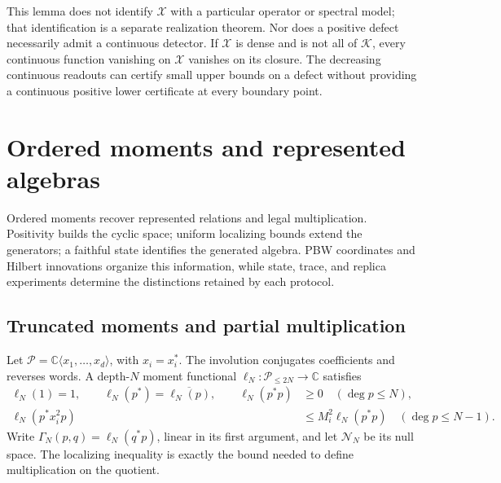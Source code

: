 \documentclass[11pt,a4paper]{amsart}
\numberwithin{equation}{section}
\theoremstyle{definition}
\theoremstyle{remark}
\newcommand{\C}{\mathbb C}
\newcommand{\PP}{\mathcal P}
\begin{document}
This lemma does not identify $\mathcal X$ with a particular operator or spectral model; that identification is a separate realization theorem. Nor does a positive defect necessarily admit a continuous detector. If $\mathcal X$ is dense and is not all of $\mathcal K$, every continuous function vanishing on $\mathcal X$ vanishes on its closure. The decreasing continuous readouts can certify small upper bounds on a defect without providing a continuous positive lower certificate at every boundary point.


\section{Ordered moments and represented algebras}\label{sec:ordered}\label{sec:minimality}
Ordered moments recover represented relations and legal multiplication. Positivity builds the cyclic space; uniform localizing bounds extend the generators; a faithful state identifies the generated algebra. PBW coordinates and Hilbert innovations organize this information, while state, trace, and replica experiments determine the distinctions retained by each protocol.

\subsection{Truncated moments and partial multiplication}
Let $\PP=\C\langle x_1,\ldots,x_d\rangle$, with $x_i=x_i^*$. The involution conjugates coefficients and reverses words. A depth-$N$ moment functional $\ell_N:\PP_{\le2N}\to\C$ satisfies
\begin{align}
 \ell_N(1)=1,\qquad \ell_N(p^*)=\overline{\ell_N(p)},\qquad
 \ell_N(p^*p)&\ge0 \quad(\deg p\le N),\label{eq:momentpositive}\\
 \ell_N(p^*x_i^2p)&\le M_i^2\ell_N(p^*p)
 \quad(\deg p\le N-1).\label{eq:momentlocalizing}
\end{align}
Write $\Gamma_N(p,q)=\ell_N(q^*p)$, linear in its first argument, and let $\mathcal N_N$ be its null space. The localizing inequality is exactly the bound needed to define multiplication on the quotient.
\end{document}
